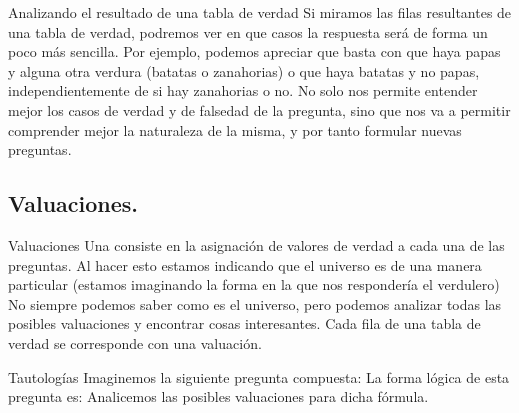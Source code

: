 
\begin{frame}{Analizando el resultado de una tabla de verdad}
  Si miramos las filas resultantes de una tabla de verdad, podremos ver en que
  casos la respuesta será \fulltrue de forma un poco más sencilla.
  \jump
  Por ejemplo, podemos apreciar que basta con que haya papas y alguna otra
  verdura (batatas o zanahorias) o que haya batatas y no papas, independientemente
  de si hay zanahorias o no.
  \jump
  No solo nos permite entender mejor los casos de verdad y de falsedad de la
  pregunta, sino que nos va a permitir comprender mejor la naturaleza de la
  misma, y por tanto formular nuevas preguntas.
\end{frame}


\subsection{Valuaciones.}


\begin{frame}{Valuaciones}
  Una  consiste en la asignación de valores de verdad a cada
  una de las preguntas. Al hacer esto estamos indicando que el universo es de
  una manera particular (estamos imaginando la forma en la que nos respondería
  el verdulero)
  \jump
  No siempre podemos saber como es el universo, pero podemos analizar todas las
  posibles valuaciones y encontrar cosas interesantes.
  \jump
  Cada fila de una tabla de verdad se corresponde con una valuación.
\end{frame}


\begin{frame}{Tautologías}
  Imaginemos la siguiente pregunta compuesta:
  \jump
  \jump
  La forma lógica de esta pregunta es:
  \jump
  \jump
  Analicemos las posibles valuaciones para dicha fórmula.
\end{frame}


